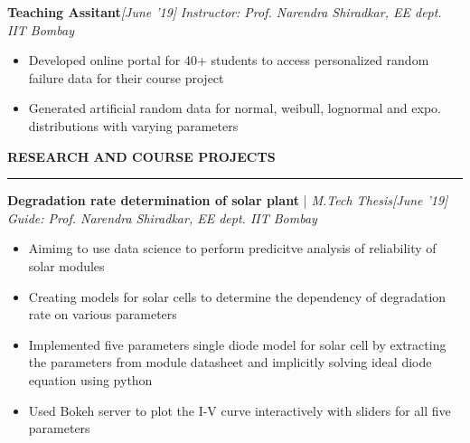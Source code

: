 \documentclass[10 pt]{article}%
\begin{document}
{{\flushleft \bf {\large{Teaching Assitant}}}\hfill {{{\em{[June '19]}}}}
\vspace{-0.8em}
{\flushleft \em{Instructor: Prof. Narendra Shiradkar, EE dept. IIT Bombay}}
\vspace{-5pt}
\begin{itemize}[leftmargin=*]
	\setlength\itemsep{1.5pt}
	\setlength\parskip{1.5pt}
	\item Developed online portal for 40+ students to access personalized random failure data for their course project%
	\item Generated artificial random data for normal, weibull, lognormal and expo. distributions with varying parameters
\end{itemize}
\begin{flushleft}\bf{\large{RESEARCH AND COURSE PROJECTS}}\end{flushleft}
\vspace{-1mm}
\hrule
\vspace{1 pt}
{\flushleft \textbf {\large{Degradation rate determination of solar plant}} |\em{ M.Tech Thesis}}\hfill {{{\em{[June '19]}}}}
\vspace{-0.8em}
{\flushleft \em{Guide: Prof. Narendra Shiradkar, EE dept. IIT Bombay}}
\vspace{-5pt}
\begin{itemize}[leftmargin=*]
	\setlength\itemsep{1.5pt}
	\setlength\parskip{1.5pt}
	\item Aimimg to use data science to perform predicitve analysis of reliability of solar modules
	\item Creating models for solar cells to determine the dependency of degradation rate on various parameters
	\item Implemented five parameters single diode model for solar cell by extracting the parameters from module datasheet and implicitly solving ideal diode equation using python
	\item Used Bokeh server to plot the I-V curve interactively with sliders for all five parameters

\end{itemize}}
\end{document}
